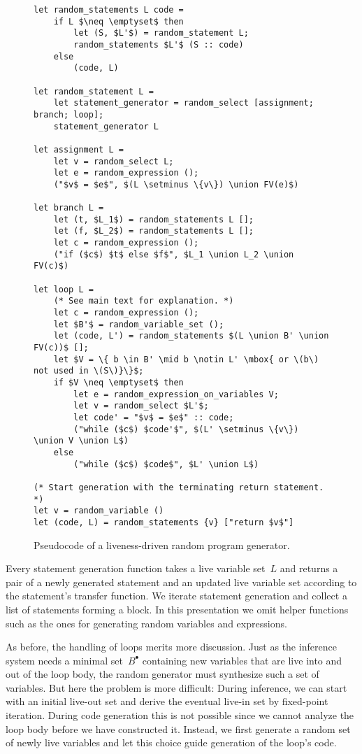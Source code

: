 \documentclass{llncs}
\newcommand{\livein}[1]{\ensuremath{#1^{\bullet}}}
\def\union{\cup}
\begin{document}
\begin{figure}
\begin{lstlisting}
let random_statements L code =
    if L $\neq \emptyset$ then
        let (S, $L'$) = random_statement L;
        random_statements $L'$ (S :: code)
    else
        (code, L)

let random_statement L =
    let statement_generator = random_select [assignment; branch; loop];
    statement_generator L

let assignment L =
    let v = random_select L;
    let e = random_expression ();
    ("$v$ = $e$", $(L \setminus \{v\}) \union FV(e)$)

let branch L =
    let (t, $L_1$) = random_statements L [];
    let (f, $L_2$) = random_statements L [];
    let c = random_expression ();
    ("if ($c$) $t$ else $f$", $L_1 \union L_2 \union FV(c)$)

let loop L =
    (* See main text for explanation. *)
    let c = random_expression ();
    let $B'$ = random_variable_set ();
    let (code, L') = random_statements $(L \union B' \union FV(c))$ [];
    let $V = \{ b \in B' \mid b \notin L' \mbox{ or \(b\) not used in \(S\)}\}$;
    if $V \neq \emptyset$ then
        let e = random_expression_on_variables V;
        let v = random_select $L'$;
        let code' = "$v$ = $e$" :: code;
        ("while ($c$) $code'$", $(L' \setminus \{v\}) \union V \union L$)
    else
        ("while ($c$) $code$", $L' \union L$)

(* Start generation with the terminating return statement. *)
let v = random_variable ()
let (code, L) = random_statements {v} ["return $v$"]
\end{lstlisting}
\caption{Pseudocode of a liveness-driven random program generator.}
\label{fig:generator}
\end{figure}

Every statement generation function takes a live variable set~\(L\) and
returns a pair of a newly generated statement and an updated live variable
set according to the statement's transfer function.
We iterate statement generation and collect a list of statements
forming a block. In this presentation we omit helper functions such as the
ones for generating random variables and expressions.

As before, the handling of loops merits more discussion. Just as the
inference system needs a minimal set~\(\livein{B}\) containing new variables
that are live into and out of the loop body, the random generator must
synthesize such a set of variables. But here the problem is more difficult:
During inference, we can start with an initial live-out set and derive the
eventual live-in set by fixed-point iteration. During code generation this
is not possible since we cannot analyze the loop body before we have
constructed it. Instead, we first generate a random set of newly live
variables and let this choice guide generation of the loop's code.
\end{document}
